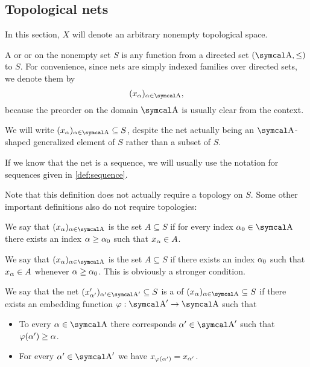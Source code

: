 \subsection{Topological nets}\label{subsec:topological_nets}

In this section, \( X \) will denote an arbitrary nonempty topological space.

\begin{definition}\label{def:topological_net}
  A  or  or  on the nonempty set \( S \) is any function from a directed set \( (\CA, \leq) \) to \( S \). For convenience, since nets are simply indexed families over directed sets, we denote them by
  \begin{equation*}
    ( x_\al )_{\al \in \CA},
  \end{equation*}
  because the preorder on the domain \( \CA \) is usually clear from the context.

  We will write \( ( x_\al )_{\al \in \CA} \subseteq S \), despite the net actually being an \( \CA \)-shaped generalized element of \( S \) rather than a subset of \( S \).

  If we know that the net is a sequence, we will usually use the notation for sequences given in \cref{def:sequence}.

  Note that this definition does not actually require a topology on \( S \). Some other important definitions also do not require topologies:
  \begin{defenum}
     We say that \( ( x_\al )_{\al \in \CA} \) is  the set \( A \subseteq S \) if for every index \( \al_0 \in \CA \) there exists an index \( \alpha \geq \alpha_0 \) such that \( x_\alpha \in A \).

     We say that \( ( x_\al )_{\al \in \CA} \) is  the set \( A \subseteq S \) if there exists an index \( \alpha_0 \) such that \( x_\alpha \in A \) whenever \( \alpha \geq \alpha_0 \). This is obviously a stronger condition.

    \cite[50]{Engelking1989} We say that the net \( ( x'_{\al'} )_{\al' \in \CA'} \subseteq S \) is a  of \( ( x_\al )_{\al \in \CA} \subseteq S \) if there exists an embedding function \( \varphi: \CA' \to \CA \) such that
    \begin{itemize}
      \item To every \( \al \in \CA \) there corresponds \( \al' \in \CA' \) such that \( \varphi(\alpha') \geq \alpha \).
      \item For every \( \al' \in \CA' \) we have \( x_{\varphi(\alpha')} = x_{\alpha'} \).
    \end{itemize}
  \end{defenum}
\end{definition}

